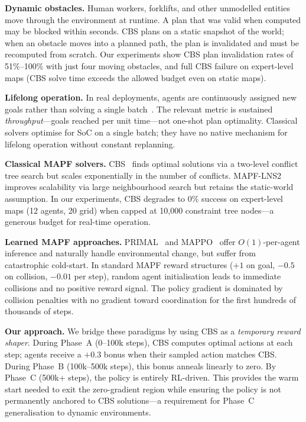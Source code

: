 \documentclass[letterpaper,twocolumn,10pt]{article}
\begin{document}
\textbf{Dynamic obstacles.} Human workers, forklifts, and other unmodelled entities
move through the environment at runtime. A plan that was valid when computed may be
blocked within seconds. CBS plans on a static snapshot of the world; when an obstacle
moves into a planned path, the plan is invalidated and must be recomputed from scratch.
Our experiments show CBS plan invalidation rates of 51\%--100\% with just four moving
obstacles, and full CBS failure on expert-level maps (CBS solve time exceeds the
allowed budget even on static maps).

\textbf{Lifelong operation.} In real deployments, agents are continuously assigned new
goals rather than solving a single batch~\cite{ma2017lifelong}. The relevant metric
is sustained \emph{throughput}---goals reached per unit time---not one-shot plan
optimality. Classical solvers optimise for SoC on a single batch; they have no native
mechanism for lifelong operation without constant replanning.

\textbf{Classical MAPF solvers.} CBS~\cite{sharon2015cbs} finds optimal solutions via
a two-level conflict tree search but scales exponentially in the number of conflicts.
MAPF-LNS2~\cite{li2021mapflns2} improves scalability via large neighbourhood search but
retains the static-world assumption. In our experiments, CBS degrades to 0\% success on
expert-level maps (12 agents, 20 grid) when capped at 10,000 constraint
tree nodes---a generous budget for real-time operation.

\textbf{Learned MAPF approaches.} PRIMAL~\cite{sartoretti2019primal} and
MAPPO~\cite{yu2022mappo} offer $O(1)$-per-agent inference and naturally handle
environmental change, but suffer from catastrophic cold-start. In standard MAPF
reward structures ($+1$ on goal, $-0.5$ on collision, $-0.01$ per step), random
agent initialisation leads to immediate collisions and no positive reward signal.
The policy gradient is dominated by collision penalties with no gradient toward
coordination for the first hundreds of thousands of steps.

\textbf{Our approach.} We bridge these paradigms by using CBS as a
\emph{temporary reward shaper}. During Phase~A (0--100k steps), CBS computes
optimal actions at each step; agents receive a $+0.3$ bonus when their sampled
action matches CBS. During Phase~B (100k--500k steps), this bonus anneals linearly
to zero. By Phase~C (500k+ steps), the policy is entirely RL-driven. This provides
the warm start needed to exit the zero-gradient region while ensuring the policy is
not permanently anchored to CBS solutions---a requirement for Phase~C generalisation
to dynamic environments.
\end{document}
